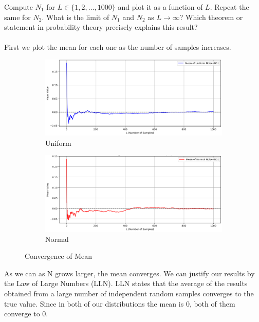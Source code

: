 \documentclass[hidelinks,12pt]{article}
\begin{document}
	 Compute $N_1$ for $L \in \{1, 2, \dots, 1000\}$ and plot it as a function of $L$. Repeat the same for $N_2$. What is the limit of $N_1$ and $N_2$ as $L \to \infty$? Which theorem or statement in probability theory precisely explains this result?
	\\ \\
	First we plot the mean for each one as the number of samples increases.
	\begin{figure}[h!]
		\centering
		\begin{subfigure}[b]{0.45\textwidth}
			\centering
			\includegraphics[width=\textwidth]{figures/mean_uniform_dist.PNG}
			\caption{Uniform}
		\end{subfigure}
		\hspace{0.5cm}
		\begin{subfigure}[b]{0.45\textwidth}
			\centering
			\includegraphics[width=\textwidth]{figures/mean_normal_dist.PNG}
			\caption{Normal}
		\end{subfigure}
		\caption{Convergence of Mean}
	\end{figure}
	
	 As we can as N grows larger, the mean converges. We can justify our results by the Law of Large Numbers (LLN). LLN states that the average of the results obtained from a large number of independent random samples converges to the true value. Since in both of our distributions the mean is 0, both of them converge to 0.
	
\end{document}
